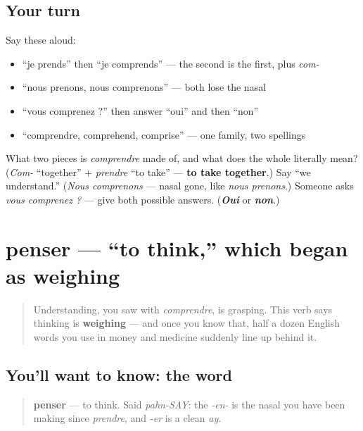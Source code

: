 \subsection*{Your turn}
Say these aloud:

\begin{itemize}
\raggedright
  \item \textquotedblleft{}je prends\textquotedblright{} then \textquotedblleft{}je comprends\textquotedblright{} — the second is the first, plus \emph{com-}
  \item \textquotedblleft{}nous prenons, nous comprenons\textquotedblright{} — both lose the nasal
  \item \textquotedblleft{}vous comprenez ?\textquotedblright{} then answer \textquotedblleft{}oui\textquotedblright{} and then \textquotedblleft{}non\textquotedblright{}
  \item \textquotedblleft{}comprendre, comprehend, comprise\textquotedblright{} — one family, two spellings
\end{itemize}

\begin{tcolorbox}[breakable,colback=teal!4,colframe=teal!35!black,title={Before you move on}]
What two pieces is \emph{comprendre} made of, and what does the whole literally mean? (\emph{Com-} \textquotedblleft{}together\textquotedblright{} + \emph{prendre} \textquotedblleft{}to take\textquotedblright{} — \textbf{to take together}.) Say \textquotedblleft{}we understand.\textquotedblright{} (\emph{Nous comprenons} — nasal gone, like \emph{nous prenons}.) Someone asks \emph{vous comprenez ?} — give both possible answers. (\emph{\textbf{Oui}} or \emph{\textbf{non}}.)
\end{tcolorbox}
\section[penser]{penser — \textquotedblleft{}to think,\textquotedblright{} which began as weighing}

\label{lesson:FR-C25-penser}



\begin{quote}
Understanding, you saw with \emph{comprendre}, is grasping. This verb says thinking is \textbf{weighing} — and once you know that, half a dozen English words you use in money and medicine suddenly line up behind it.
\end{quote}

\subsection*{You'll want to know: the word}
\begin{quote}
\textbf{penser} — to think. Said \emph{pahn-SAY}: the \emph{-en-} is the nasal you have been making since \emph{prendre}, and \emph{-er} is a clean \emph{ay}.
\end{quote}

